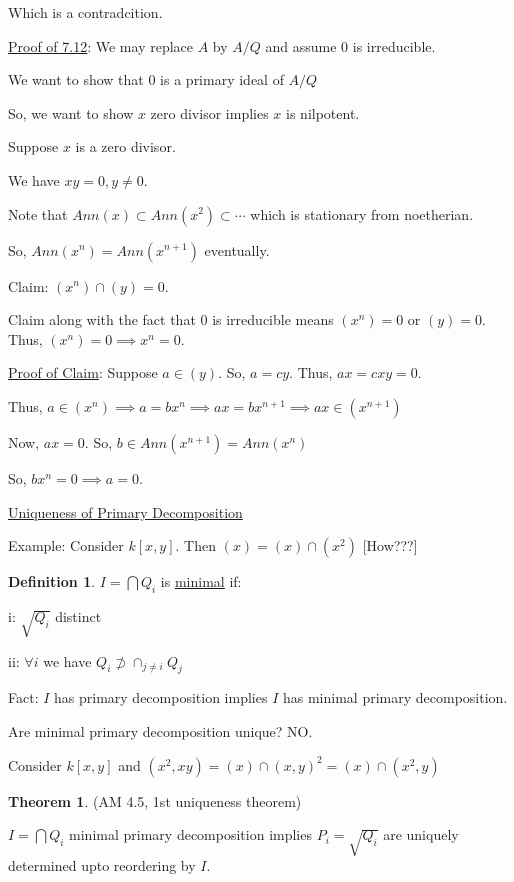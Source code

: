 \documentclass{article}
\theoremstyle{definition}
\newtheorem{definition}{Definition}
\newtheorem{theorem}{Theorem}
\begin{document}
Which is a contradcition.

\underline{Proof of 7.12}: We may replace \(A\) by \(A / Q\) and assume \(0\) is irreducible.

We want to show that \(0\) is a primary ideal of \(A / Q\)

So, we want to show \(x\) zero divisor implies \(x\) is nilpotent.

Suppose \(x\) is a zero divisor.

We have \(xy=0,y\neq 0\).

Note that \(Ann(x) \subset Ann(x^2) \subset \cdots\) which is stationary from noetherian.

So, \(Ann(x^n)=Ann(x^{n+1})\) eventually.

Claim: \((x^n)\cap (y)=0\).

Claim along with the fact that \(0\) is irreducible means \((x^n)=0\) or \((y)=0\). Thus, \((x^n)=0 \implies x^n = 0\).

\underline{Proof of Claim}: Suppose \(a\in (y)\). So, \(a = cy\). Thus, \(ax=cxy=0\).

Thus, \(a\in (x^n) \implies a = bx^n \implies ax = bx^{n+1} \implies ax\in (x^{n+1})\)

Now, \(ax=0\). So, \(b\in Ann(x^{n+1})=Ann(x^n)\)

So, \(bx^n=0 \implies a = 0\).

\underline{Uniqueness of Primary Decomposition}

Example: Consider \(k[x,y]\). Then \((x)=(x)\cap (x^2)\) [How???]

\begin{definition}
    \(I = \bigcap Q_i\) is \underline{minimal} if:
    
    i: \(\sqrt{Q_i} \) distinct
    
    ii: \(\forall i\) we have \(Q_i \not\supset \cap_{j\neq i} Q_j\)  
\end{definition}

Fact: \(I\) has primary decomposition implies \(I\) has minimal primary decomposition.

Are minimal primary decomposition unique? NO.

Consider \(k[x,y]\) and \((x^2,xy)=(x)\cap (x,y)^2 = (x)\cap(x^2,y)\) 

\begin{theorem}
    (AM 4.5, 1st uniqueness theorem)

    \(I=\bigcap Q_i\) minimal primary decomposition implies \(P_i = \sqrt{Q_i}\) are uniquely determined upto reordering by \(I\).
    
\end{theorem}
\end{document}
